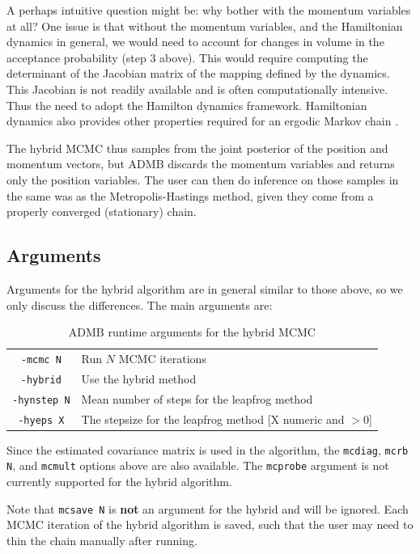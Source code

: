 \documentclass{article}\usepackage[]{graphicx}\usepackage[]{color}
\begin{document}
A perhaps intuitive question might be: why bother with the
momentum variables at all? One issue is that without the
momentum variables, and the Hamiltonian dynamics in general,
we would need to account for changes in volume in the
acceptance probability (step 3 above)\cite{brooks2011}. This
would require computing the determinant of the Jacobian
matrix of the mapping defined by the dynamics. This Jacobian
is not readily available and is often computationally
intensive. Thus the need to adopt the Hamilton dynamics
framework.  Hamiltonian dynamics also provides other
properties required for an ergodic Markov chain
\cite{brooks2011}.

The hybrid MCMC thus samples from the joint posterior of the
position and momentum vectors, but ADMB discards the
momentum variables and returns only the position
variables. The user can then do inference on those samples
in the same was as the Metropolis-Hastings method, given
they come from a properly converged (stationary) chain.

\subsection{Arguments}
Arguments for the hybrid algorithm are in general similar to
those above, so we only discuss the differences. The main
arguments are:
\begin{table}[H]
  \centering
  \begin{tabular}[h]{|cl|}
    \hline
    \texttt{-mcmc N} & Run $N$ MCMC iterations\\
    \texttt{-hybrid} & Use the hybrid method\\
    \texttt{-hynstep N} & Mean number of steps for the leapfrog method\\
    \texttt{-hyeps X} & The stepsize for the leapfrog method [X numeric and $>0$]\\
    \hline
  \end{tabular}
  \caption{ADMB runtime arguments for the hybrid MCMC}
  \label{tab:hy_args}
\end{table}
Since the estimated covariance matrix is used in the
algorithm, the \texttt{mcdiag}, \texttt{mcrb N}, and
\texttt{mcmult} options above are also available. The
\texttt{mcprobe} argument is not currently supported for the
hybrid algorithm.

Note that \texttt{mcsave N} is \textbf{not} an argument for
the hybrid and will be ignored. Each MCMC iteration of the
hybrid algorithm is saved, such that the user may need to
thin the chain manually after running.
\end{document}
